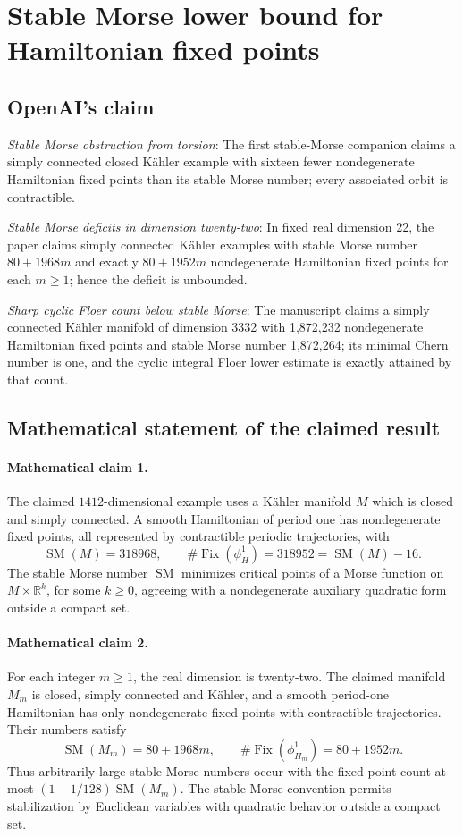 \documentclass[11pt]{article}
\begin{document}
\section*{Stable Morse lower bound for Hamiltonian fixed points}

\subsection{OpenAI's claim}
\textit{Stable Morse obstruction from torsion}: The first stable-Morse companion claims a simply connected closed Kähler example with sixteen fewer nondegenerate Hamiltonian fixed points than its stable Morse number; every associated orbit is contractible.

\textit{Stable Morse deficits in dimension twenty-two}: In fixed real dimension 22, the paper claims simply connected Kähler examples with stable Morse number $80+1968m$ and exactly $80+1952m$ nondegenerate Hamiltonian fixed points for each $m\ge1$; hence the deficit is unbounded.

\textit{Sharp cyclic Floer count below stable Morse}: The manuscript claims a simply connected Kähler manifold of dimension 3332 with 1,872,232 nondegenerate Hamiltonian fixed points and stable Morse number 1,872,264; its minimal Chern number is one, and the cyclic integral Floer lower estimate is exactly attained by that count.

\subsection{Mathematical statement of the claimed result}
\paragraph{Mathematical claim 1.} The claimed $1412$-dimensional example uses a K\"ahler manifold $M$ which is closed and simply connected. A smooth Hamiltonian of period one has nondegenerate fixed points, all represented by contractible periodic trajectories, with \[\operatorname{SM}(M)=318968,\qquad\#\operatorname{Fix}(\phi_H^1)=318952=\operatorname{SM}(M)-16.\] The stable Morse number $\operatorname{SM}$ minimizes critical points of a Morse function on $M\times\mathbb R^k$, for some $k\ge0$, agreeing with a nondegenerate auxiliary quadratic form outside a compact set.

\paragraph{Mathematical claim 2.} For each integer $m\ge1$, the real dimension is twenty-two. The claimed manifold $M_m$ is closed, simply connected and K\"ahler, and a smooth period-one Hamiltonian has only nondegenerate fixed points with contractible trajectories. Their numbers satisfy \[\operatorname{SM}(M_m)=80+1968m,\qquad\#\operatorname{Fix}(\phi_{H_m}^1)=80+1952m.\] Thus arbitrarily large stable Morse numbers occur with the fixed-point count at most $(1-1/128)\operatorname{SM}(M_m)$. The stable Morse convention permits stabilization by Euclidean variables with quadratic behavior outside a compact set.
\end{document}
